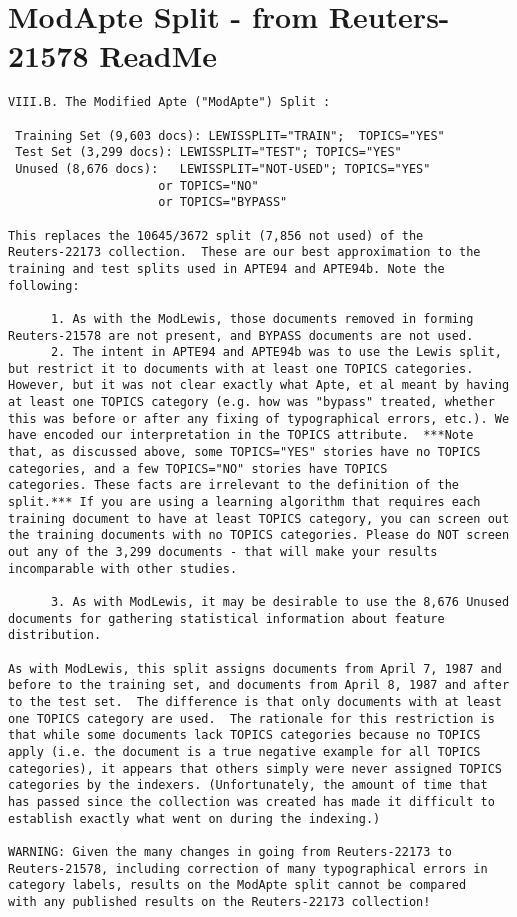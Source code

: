 \documentclass[12pt]{article}
\begin{document}
\section{ModApte Split - from Reuters-21578 ReadMe} \label{sec:ModApteQuote}
\footnotesize
\begin{verbatim}
VIII.B. The Modified Apte ("ModApte") Split :

 Training Set (9,603 docs): LEWISSPLIT="TRAIN";  TOPICS="YES"
 Test Set (3,299 docs): LEWISSPLIT="TEST"; TOPICS="YES"
 Unused (8,676 docs):   LEWISSPLIT="NOT-USED"; TOPICS="YES"
                     or TOPICS="NO" 
                     or TOPICS="BYPASS"

This replaces the 10645/3672 split (7,856 not used) of the
Reuters-22173 collection.  These are our best approximation to the
training and test splits used in APTE94 and APTE94b. Note the
following:

      1. As with the ModLewis, those documents removed in forming
Reuters-21578 are not present, and BYPASS documents are not used.  
      2. The intent in APTE94 and APTE94b was to use the Lewis split,
but restrict it to documents with at least one TOPICS categories.
However, but it was not clear exactly what Apte, et al meant by having
at least one TOPICS category (e.g. how was "bypass" treated, whether
this was before or after any fixing of typographical errors, etc.). We
have encoded our interpretation in the TOPICS attribute.  ***Note
that, as discussed above, some TOPICS="YES" stories have no TOPICS
categories, and a few TOPICS="NO" stories have TOPICS
categories. These facts are irrelevant to the definition of the
split.*** If you are using a learning algorithm that requires each
training document to have at least TOPICS category, you can screen out
the training documents with no TOPICS categories. Please do NOT screen
out any of the 3,299 documents - that will make your results
incomparable with other studies.

      3. As with ModLewis, it may be desirable to use the 8,676 Unused
documents for gathering statistical information about feature
distribution.

As with ModLewis, this split assigns documents from April 7, 1987 and
before to the training set, and documents from April 8, 1987 and after
to the test set.  The difference is that only documents with at least
one TOPICS category are used.  The rationale for this restriction is
that while some documents lack TOPICS categories because no TOPICS
apply (i.e. the document is a true negative example for all TOPICS
categories), it appears that others simply were never assigned TOPICS
categories by the indexers. (Unfortunately, the amount of time that
has passed since the collection was created has made it difficult to
establish exactly what went on during the indexing.)

WARNING: Given the many changes in going from Reuters-22173 to
Reuters-21578, including correction of many typographical errors in
category labels, results on the ModApte split cannot be compared
with any published results on the Reuters-22173 collection!

\end{verbatim}
  
  
  
\end{document}
